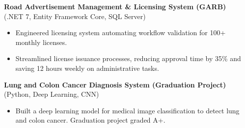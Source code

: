 \documentclass[11pt,a4paper]{article}
\begin{document}
\textbf{Road Advertisement Management \& Licensing System (GARB)} \\
(.NET 7, Entity Framework Core, SQL Server)
\begin{itemize}
    \item Engineered licensing system automating workflow validation for 100+ monthly licenses.
    \item Streamlined license issuance processes, reducing approval time by 35\% and saving 12 hours weekly on administrative tasks.
\end{itemize}

\textbf{Lung and Colon Cancer Diagnosis System (Graduation Project)} \\
(Python, Deep Learning, CNN)
\begin{itemize}
    \item Built a deep learning model for medical image classification to detect lung and colon cancer. Graduation project graded A+.
\end{itemize}
\end{document}
